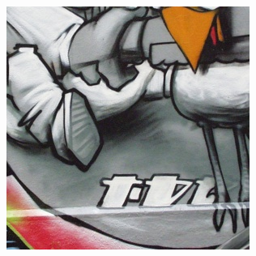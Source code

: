 \documentclass[review]{elsarticle}
\begin{document}
\begin{figure}[htb]
\begin{subfigure}[t]{0.16\columnwidth}
    \end{subfigure}%
    ~~ %
    \begin{subfigure}[t]{0.16\columnwidth}
        \centering
        \includegraphics[width=1\columnwidth]{images/acr/patches/patch_5_1}
    \end{subfigure}%
    \vspace{1.5 mm}


\end{figure}
\end{document}
